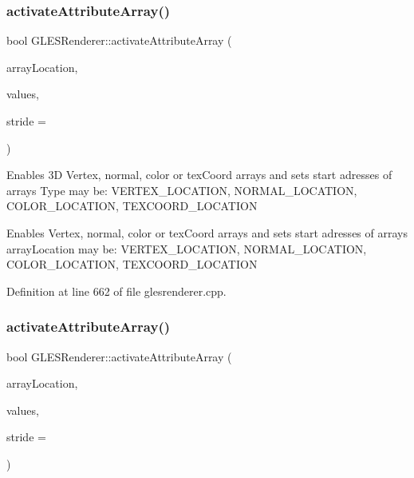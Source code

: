 \subsubsection{\texorpdfstring{activateAttributeArray()}{activateAttributeArray()}\hspace{0.1cm}{\footnotesize\ttfamily [2/4]}}
{\footnotesize\ttfamily bool G\+L\+E\+S\+Renderer\+::activate\+Attribute\+Array (\begin{DoxyParamCaption}\item[{\mbox{\hyperlink{class_g_l_e_s_renderer_a05f4cf233d5cf60f4d6ea50ddc06a2c4}{Attribute\+Location}}}]{array\+Location,  }\item[{const Q\+Vector3D $\ast$}]{values,  }\item[{int}]{stride = {} }\end{DoxyParamCaption})}

Enables 3D Vertex, normal, color or tex\+Coord arrays and sets start adresses of arrays Type may be\+: V\+E\+R\+T\+E\+X\+\_\+\+L\+O\+C\+A\+T\+I\+ON, N\+O\+R\+M\+A\+L\+\_\+\+L\+O\+C\+A\+T\+I\+ON, C\+O\+L\+O\+R\+\_\+\+L\+O\+C\+A\+T\+I\+ON, T\+E\+X\+C\+O\+O\+R\+D\+\_\+\+L\+O\+C\+A\+T\+I\+ON

Enables Vertex, normal, color or tex\+Coord arrays and sets start adresses of arrays array\+Location may be\+: V\+E\+R\+T\+E\+X\+\_\+\+L\+O\+C\+A\+T\+I\+ON, N\+O\+R\+M\+A\+L\+\_\+\+L\+O\+C\+A\+T\+I\+ON, C\+O\+L\+O\+R\+\_\+\+L\+O\+C\+A\+T\+I\+ON, T\+E\+X\+C\+O\+O\+R\+D\+\_\+\+L\+O\+C\+A\+T\+I\+ON 

Definition at line 662 of file glesrenderer.\+cpp.

\mbox{\label{class_g_l_e_s_renderer_ada229880a48efdbb3daaa375b701ace0}} 
\subsubsection{\texorpdfstring{activateAttributeArray()}{activateAttributeArray()}\hspace{0.1cm}{\footnotesize\ttfamily [3/4]}}
{\footnotesize\ttfamily bool G\+L\+E\+S\+Renderer\+::activate\+Attribute\+Array (\begin{DoxyParamCaption}\item[{\mbox{\hyperlink{class_g_l_e_s_renderer_a05f4cf233d5cf60f4d6ea50ddc06a2c4}{Attribute\+Location}}}]{array\+Location,  }\item[{const \mbox{\hyperlink{class_g_l_color_rgba}{G\+L\+Color\+Rgba}} $\ast$}]{values,  }\item[{int}]{stride = {} }\end{DoxyParamCaption})}

